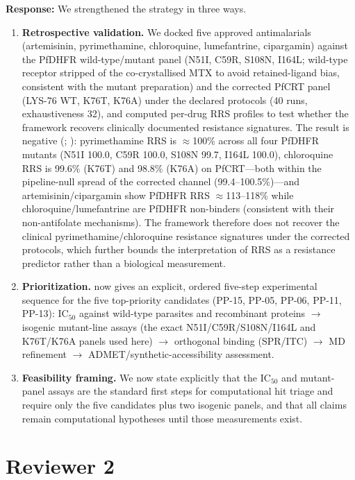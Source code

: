 \documentclass[11pt]{article}
\begin{document}
\textbf{Response:} We strengthened the strategy in three ways.
\begin{enumerate}[leftmargin=1.6em]
\item \textbf{Retrospective validation.} We docked five approved antimalarials
(artemisinin, pyrimethamine, chloroquine, lumefantrine, cipargamin) against the PfDHFR
wild-type/mutant panel (N51I, C59R, S108N, I164L; wild-type receptor stripped of the
co-crystallised MTX to avoid retained-ligand bias, consistent with the mutant
preparation) and the corrected PfCRT panel (LYS-76 WT, K76T, K76A) under the declared
protocols (\num{40} runs, exhaustiveness \num{32}), and computed per-drug RRS profiles to test
whether the framework recovers clinically documented resistance signatures. The result is
negative (; ): pyrimethamine
RRS is $\approx$100\% across all four PfDHFR mutants (N51I 100.0, C59R 100.0,
S108N 99.7, I164L 100.0), chloroquine RRS is 99.6\% (K76T) and 98.8\%
(K76A) on PfCRT---both within the pipeline-null spread of the corrected
channel (99.4--100.5\%)---and artemisinin/cipargamin show PfDHFR RRS
$\approx$113--118\% while chloroquine/lumefantrine are PfDHFR non-binders
(consistent with their non-antifolate mechanisms). The framework therefore
does not recover the clinical pyrimethamine/chloroquine resistance signatures
under the corrected protocols, which further bounds the interpretation of RRS
as a resistance predictor rather than a biological measurement.
\item \textbf{Prioritization.}  now gives an explicit, ordered five-step experimental
sequence for the five top-priority candidates (PP-15, PP-05, PP-06, PP-11, PP-13):
IC$_{50}$ against wild-type parasites and recombinant proteins $\rightarrow$ isogenic
mutant-line assays (the exact N51I/C59R/S108N/I164L and K76T/K76A panels used here)
$\rightarrow$ orthogonal binding (SPR/ITC) $\rightarrow$ MD refinement $\rightarrow$
ADMET/synthetic-accessibility assessment.
\item \textbf{Feasibility framing.} We now state explicitly that the IC$_{50}$ and mutant-panel
assays are the standard first steps for computational hit triage and require only the five
candidates plus two isogenic panels, and that all claims remain computational hypotheses until
those measurements exist.
\end{enumerate}

\section*{Reviewer 2}
\end{document}
